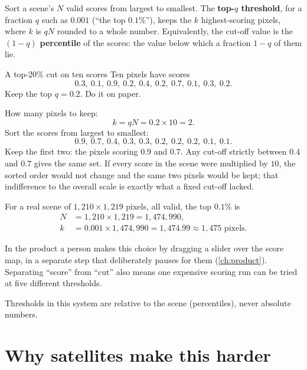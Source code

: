 \begin{definition}
Sort a scene's $N$ valid scores from largest to smallest. The \textbf{top-$q$ threshold}, for a
fraction $q$ such as $0.001$ (``the top $0.1\%$''), keeps the $k$ highest-scoring pixels, where
$k$ is $qN$ rounded to a whole number. Equivalently, the cut-off value is the
$(1-q)$ \textbf{percentile} of the scores: the value below which a fraction $1-q$ of them lie.
\end{definition}

\begin{worked}[label={we:problem:percentile}]{A top-20\% cut on ten scores}
Ten pixels have scores
\[ 0.3,\ 0.1,\ 0.9,\ 0.2,\ 0.4,\ 0.2,\ 0.7,\ 0.1,\ 0.3,\ 0.2. \]
Keep the top $q = 0.2$. Do it on paper.

How many pixels to keep:
\[ k = q N = 0.2 \times 10 = 2. \]
Sort the scores from largest to smallest:
\[ 0.9,\ 0.7,\ 0.4,\ 0.3,\ 0.3,\ 0.2,\ 0.2,\ 0.2,\ 0.1,\ 0.1. \]
Keep the first two: the pixels scoring $0.9$ and $0.7$. Any cut-off strictly between $0.4$ and
$0.7$ gives the same set. If every score in the scene were multiplied by $10$, the sorted order
would not change and the same two pixels would be kept; that indifference to the overall scale is
exactly what a fixed cut-off lacked.

For a real scene of $1{,}210 \times 1{,}219$ pixels, all valid, the top $0.1\%$ is
\begin{align*}
N &= 1{,}210 \times 1{,}219 = 1{,}474{,}990,\\
k &= 0.001 \times 1{,}474{,}990 = 1{,}474.99 \approx 1{,}475 \text{ pixels.}
\end{align*}
\end{worked}

In the product a person makes this choice by dragging a slider over the score map, in a separate
step that deliberately pauses for them (\cref{ch:product}). Separating ``score'' from ``cut'' also
means one expensive scoring run can be tried at five different thresholds.

\begin{keypoint}
Thresholds in this system are relative to the scene (percentiles), never absolute numbers.
\end{keypoint}

\section{Why satellites make this harder}\label{sec:problem:satellites}

